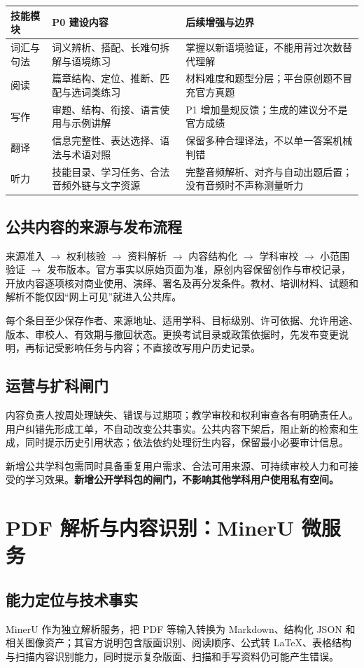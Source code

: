 \documentclass[UTF8,a4paper,11pt,fontset=none]{ctexart}
\newcommand{\cth}[1]{\textbf{\sffamily #1}}
\newcommand{\newsec}[1]{\clearpage\section{#1}}
\newenvironment{tbl}{\par\vspace{3pt}\small\noindent\ignorespaces}{\unskip\par\vspace{5pt}}
\begin{document}
\begin{tbl}
\begin{tabularx}{\linewidth}{@{}L{25mm}YY@{}}
\toprule
\cth{技能模块}&\cth{P0 建设内容}&\cth{后续增强与边界}\\\midrule
词汇与句法&词义辨析、搭配、长难句拆解与语境练习&掌握以新语境验证，不能用背过次数替代理解\\
阅读&篇章结构、定位、推断、匹配与选词类练习&材料难度和题型分层；平台原创题不冒充官方真题\\
写作&审题、结构、衔接、语言使用与示例讲解&P1 增加量规反馈；生成的建议分不是官方成绩\\
翻译&信息完整性、表达选择、语法与术语对照&保留多种合理译法，不以单一答案机械判错\\
听力&技能目录、学习任务、合法音频外链与文字资源&完整音频解析、对齐与自动出题后置；没有音频时不声称测量听力\\
\bottomrule
\end{tabularx}
\end{tbl}

\subsection{公共内容的来源与发布流程}
来源准入 $\rightarrow$ 权利核验 $\rightarrow$ 资料解析 $\rightarrow$ 内容结构化 $\rightarrow$ 学科审校 $\rightarrow$ 小范围验证 $\rightarrow$ 发布版本。官方事实以原始页面为准，原创内容保留创作与审校记录，开放内容逐项核对商业使用、演绎、署名及再分发条件。教材、培训材料、试题和解析不能仅因“网上可见”就进入公共库。\cite{copyright}

每个条目至少保存作者、来源地址、适用学科、目标级别、许可依据、允许用途、版本、审校人、有效期与撤回状态。更换考试目录或政策依据时，先发布变更说明，再标记受影响任务与内容；不直接改写用户历史记录。

\subsection{运营与扩科闸门}
内容负责人按周处理缺失、错误与过期项；教学审校和权利审查各有明确责任人。用户纠错先形成工单，不自动改变公共事实。公共内容下架后，阻止新的检索和生成，同时提示历史引用状态；依法依约处理衍生内容，保留最小必要审计信息。

新增公共学科包需同时具备重复用户需求、合法可用来源、可持续审校人力和可接受的学习效果。\textbf{新增公开学科包的闸门，不影响其他学科用户使用私有空间。}

\newsec{PDF 解析与内容识别：MinerU 微服务}
\subsection{能力定位与技术事实}
MinerU 作为独立解析服务，把 PDF 等输入转换为 Markdown、结构化 JSON 和相关图像资产；其官方说明包含版面识别、阅读顺序、公式转 LaTeX、表格结构与扫描内容识别能力，同时提示复杂版面、扫描和手写资料仍可能产生错误。\cite{mineru_readme}
\end{document}
